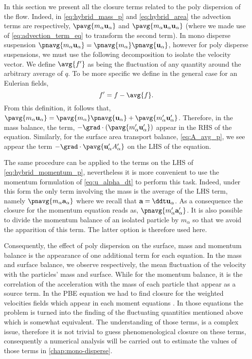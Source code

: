 In this section we present all the closure terms related to the poly dispersion of the flow. 
Indeed, in \ref{eq:hybrid_mass_p} and \ref{eq:hybrid_area} the advection terms are respectively, $\pavg{m_\alpha \textbf{u}_\alpha}$ and $\pavg{m_\alpha \textbf{u}_\alpha\textbf{u}_\alpha}$  (where we made use of \ref{eq:advection_term_eq} to transform the second term).  
In mono disperse suspension $\pnavg{m_\alpha \textbf{u}_\alpha} = \pnavg{m_\alpha}\pnavg{\textbf{u}_\alpha}$, however for poly disperse suspensions, we must use the following decomposition to isolate the velocity vector.
We define $\avg{f'}$ as being the fluctuation of any quantity around the arbitrary average of $q$.
To be more specific we define in the general case for an Eulerian fields, 
\begin{equation*}
    f' = f - \avg{f}. 
\end{equation*}
From this definition, it follows that, $\pavg{m_\alpha \textbf{u}_\alpha} = \pavg{m_\alpha}\pnavg{\textbf{u}_\alpha} + \pavg{m_\alpha' \textbf{u}_\alpha'}$.
Therefore, in the mass balance, the term, $-\grad\cdot(\pavg{m_\alpha' \textbf{u}_\alpha'})$ appear in the RHS of the equation. 
Similarly, for the surface area transport balance, \ref{eq:A_avg_p}, we see appear the term $-\grad \cdot \pavg{\textbf{u}_\alpha' A_\alpha'}$ on the LHS of the equation. 

The same procedure can be applied to the terms on the LHS of \ref{eq:hybrid_momentum_p}, nevertheless it is more convenient to use the momentum formulation of \ref{eq:u_alpha_dt} to perform this task. 
Indeed, under this form the only term involving the mass is the average of the LHS term, namely $\pnavg{m_\alpha \textbf{a}_\alpha}$ where we recall that $\textbf{a} = \ddt \textbf{u}_\alpha$. 
As a consequence the closure for the momentum equation reads as, $\pnavg{m_\alpha' \textbf{a}_\alpha'}$.
It is also possible to divide the momentum balance of an isolated particle by $m_\alpha$ so that we avoid the apparition of this term.
The latter option is therefore used here.

Consequently, the effect of poly dispersion on the surface, mass and momentum balance is the appearance of one additional term for each equation.
In the mass and surface balance, we observe respectively, the mean fluctuation of the velocity with the particles' mass and surface. 
While for the momentum balance, it is the correlation of the acceleration with the mass of each particle that appear as a source term. 
In the PBE equation we had to find closure for the weighted velocities fields which appear in each moment equations \citet{zaepffel2011modelisation}.
In those equations the problem is turned into the finding of the fluctuating quantities mentioned above which is somewhat equivalent.  
The understanding of those terms, is a complex issue, therefore it is not trivial to guess phenomenological closure on these terms, consequently a numerical analysis will be carried out to estimate the values of those terms in \ref{chap:mono-disperse}.


